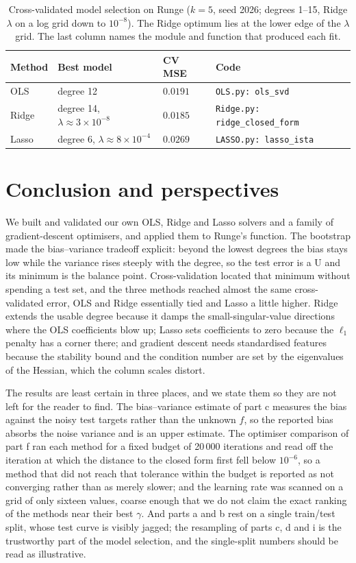 \documentclass[a4paper,11pt]{article}
\begin{document}
\begin{table}[h]
\centering
\caption{Cross-validated model selection on Runge ($k=5$, seed 2026; degrees
1--15, Ridge $\lambda$ on a log grid down to $10^{-8}$). The Ridge optimum lies
at the lower edge of the $\lambda$ grid. The last column names the module and
function that produced each fit.}
\label{tab:final}
\begin{tabular}{llll}
\toprule
Method & Best model & CV MSE & Code \\
\midrule
OLS   & degree 12                                            & $0.0191$ & \texttt{OLS.py: ols\_svd} \\
Ridge & degree 14, $\lambda\approx3\times10^{-8}$               & $0.0185$ & \texttt{Ridge.py: ridge\_closed\_form} \\
Lasso & degree 6, $\lambda\approx8\times10^{-4}$              & $0.0269$ & \texttt{LASSO.py: lasso\_ista} \\
\bottomrule
\end{tabular}
\end{table}

\section{Conclusion and perspectives}
\label{sec:conclusion}
We built and validated our own OLS, Ridge and Lasso solvers and a family of
gradient-descent optimisers, and applied them to Runge's function. The bootstrap
made the bias--variance tradeoff explicit: beyond the lowest degrees the bias
stays low while the variance rises steeply with the degree, so the test error is
a U and its minimum is the balance point. Cross-validation located that minimum without spending a test
set, and the three methods reached almost the same cross-validated error, OLS
and Ridge essentially tied and Lasso a little higher. Ridge extends the usable
degree because it damps the small-singular-value directions where the OLS
coefficients blow up; Lasso sets coefficients to zero because the $\ell_1$
penalty has a corner there; and gradient descent needs standardised features
because the stability bound and the condition number are set by the eigenvalues
of the Hessian, which the column scales distort.

The results are least certain in three places, and we state them so they are not
left for the reader to find. The bias--variance estimate of part c measures the
bias against the noisy test targets rather than the unknown $f$, so the reported
bias absorbs the noise variance and is an upper estimate. The optimiser
comparison of part f ran each method for a fixed budget of 20\,000 iterations
and read off the iteration at which the distance to the closed form first fell
below $10^{-6}$, so a method that did not reach that tolerance within the budget
is reported as not converging rather than as merely slower; and the learning
rate was scanned on a grid of only sixteen values, coarse enough that we do not
claim the exact ranking of the methods near their best $\gamma$. And parts a and b rest on a single train/test split, whose test
curve is visibly jagged; the resampling of parts c, d and i is the trustworthy
part of the model selection, and the single-split numbers should be read as
illustrative.
\end{document}
